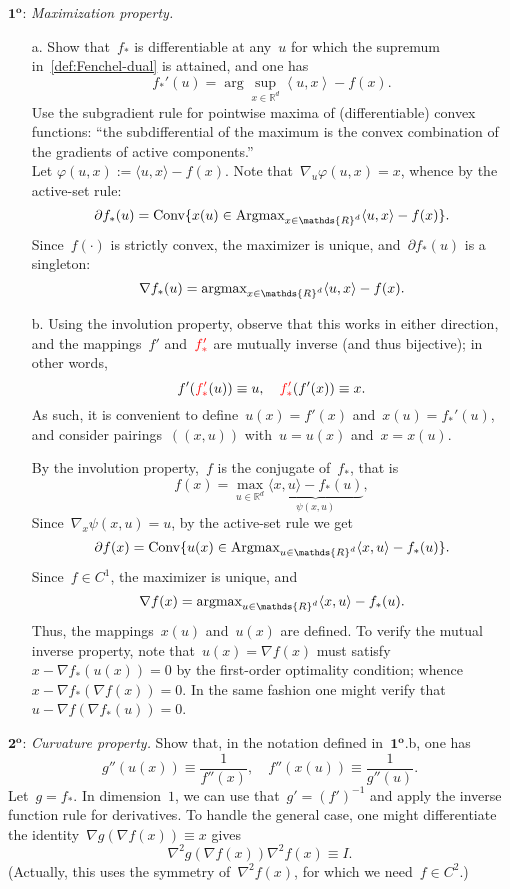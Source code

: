 \documentclass[11pt]{article}
\newcommand{\proofstep}[1]{$\boldsymbol{{#1}^o}$}
\newcommand{\odima}[1]{{\color{red} #1}}
\newcommand{\R}{\mathds{R}}
\newcommand{\lang}{\left\langle}
\newcommand{\rang}{\right\rangle}
\begin{document}
\noindent
\proofstep{1}: {\em Maximization property.}
\begin{itemize}
\item[a.] Show that~$f_*$ is differentiable at any~$u$ for which the supremum in~\eqref{def:Fenchel-dual} is attained, and one has
\[
f_*'(u) = \arg\sup_{x \in \R^d} \lang u, x \rang - f(x).
\]
Use the subgradient rule for pointwise maxima of (differentiable) convex functions: ``the subdifferential of the maximum is the convex combination of the gradients of active components.''\\
\odima{Let
$
\varphi(u,x) := \langle u, x \rangle - f(x).
$
Note that~$\nabla_{u} \varphi(u,x) = x$, whence by the active-set rule:
\[
\partial f_*(u) = \textup{Conv} \{ x(u) \in \textup{Argmax}_{x \in \R^d} \langle u, x \rangle - f(x) \}.
\]
Since~$f(\cdot)$ is strictly convex, the maximizer is unique, and~$\partial f_*(u)$ is a singleton: 
\[
\nabla f_*(u) = \textup{argmax}_{x \in \R^d} \langle u, x \rangle - f(x).
\]
}
\item[b.]
Using the involution property, observe that this works in either direction, and the mappings~$f'$ and~$\odima{f_*'}$ are mutually inverse (and thus bijective); in other words,
\[
f'(\odima{f_*'}(u)) \equiv u, \quad \odima{f_*'}(f'(x)) \equiv x.
\]
As such, it is convenient to define~$u(x) = f'(x)$ and~$x(u) = f_*'(u)$, and consider pairings~$(( x,u ))$ with~$u = u(x)$ and~$x = x(u)$.

\odima{By the involution property,~$f$ is the conjugate of~$f_*$, that is
\[
f(x) = \max_{u \in \R^d} \underbrace{\langle x, u \rangle - f_*(u)}_{\psi(x,u)},
\]
Since~$\nabla_x \psi(x,u) = u$, by the active-set rule we get
\[
\partial f(x) = \textup{Conv} \{ u(x) \in \textup{Argmax}_{u \in \R^d} \langle x, u \rangle - f_*(u) \}.
\]
Since~$f \in C^{1}$, the maximizer is unique, and 
\[
\nabla f(x) = \textup{argmax}_{u \in \R^d} \langle x, u \rangle - f_*(u). 
\]
Thus, the mappings~$x(u)$ and~$u(x)$ are defined. To verify the mutual inverse property, note that~$u(x) = \nabla f(x)$ must satisfy~$x - \nabla f_*(u(x)) = 0$ by the first-order optimality condition; whence~$x - \nabla f_*(\nabla f(x)) = 0$. 
In the same fashion one might verify that~$u - \nabla f(\nabla f_*(u)) = 0$.
}

\end{itemize}

\noindent
\proofstep{2}: {\em Curvature property.}
Show that, in the notation defined in~\proofstep{1}.b, one has
\[
g''(u(x))  \equiv \frac{1}{f''(x)}, \quad f''(x(u))  \equiv \frac{1}{g''(u)}.
\]
\odima{Let~$g = f_*$. 
In dimension~$1$, we can use that~$g' = (f')^{-1}$ and apply the inverse function rule for derivatives.
To handle the general case, one might differentiate the identity~$\nabla g(\nabla f(x)) \equiv x$ gives
\[
\nabla^2 g(\nabla f(x)) \nabla^2 f(x)  \equiv I.
\]
(Actually, this uses the symmetry of~$\nabla^2 f(x)$, for which we need~$f \in C^2$.)
}
\end{document}
